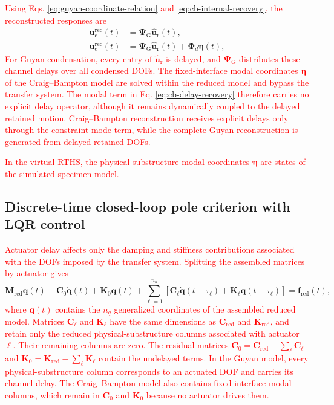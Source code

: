 \documentclass[11pt,a4paper]{article}
\numberwithin{equation}{section}
\newcommand{\rev}[1]{\textcolor{red}{#1}}
\begin{document}
\rev{Using Eqs. \eqref{eq:guyan-coordinate-relation} and \eqref{eq:cb-internal-recovery}, the reconstructed responses are}
\begin{subequations}
	\label{eq:delay-recovery}
	\begin{align}
		\bm{u}_{\mathrm{c}}^{\mathrm{rec}}(t)&=\bm{\Psi}_{\mathrm{G}}\hat{\bm{u}}_{\mathrm{r}}(t),
		\label{eq:guyan-delay-recovery}\\
		\bm{u}_{\mathrm{c}}^{\mathrm{rec}}(t)&=\bm{\Psi}_{\mathrm{G}}\hat{\bm{u}}_{\mathrm{r}}(t)
		+\bm{\Phi}_{d}\bm{\eta}(t),
		\label{eq:cb-delay-recovery}
	\end{align}
\end{subequations}
\rev{For Guyan condensation, every entry of \(\hat{\bm{u}}_{\mathrm{r}}\) is delayed, and \(\bm{\Psi}_{\mathrm{G}}\) distributes these channel delays over all condensed DOFs. The fixed-interface modal coordinates \(\bm{\eta}\) of the Craig--Bampton model are solved within the reduced model and bypass the transfer system. The modal term in Eq. \eqref{eq:cb-delay-recovery} therefore carries no explicit delay operator, although it remains dynamically coupled to the delayed retained motion. Craig--Bampton reconstruction receives explicit delays only through the constraint-mode term, while the complete Guyan reconstruction is generated from delayed retained DOFs.}

\rev{In the virtual RTHS, the physical-substructure modal coordinates \(\bm{\eta}\) are states of the simulated specimen model.}

\subsection{Discrete-time closed-loop pole criterion with LQR control}
\label{sec:pole-criterion}

\rev{Actuator delay affects only the damping and stiffness contributions associated with the DOFs imposed by the transfer system. Splitting the assembled matrices by actuator gives}
\begin{equation}
	\mathbf{M}_{\mathrm{red}}\ddot{\bm{q}}(t)+\mathbf{C}_{0}\dot{\bm{q}}(t)+\mathbf{K}_{0}\bm{q}(t)
	+\sum_{\ell=1}^{n_{\mathrm{a}}}
	\left[
	\mathbf{C}_{\ell}\dot{\bm{q}}(t-\tau_{\ell})
	+\mathbf{K}_{\ell}\bm{q}(t-\tau_{\ell})
	\right]
	=\bm{f}_{\mathrm{red}}(t),
	\label{eq:delayed-eom}
\end{equation}
\rev{where \(\bm{q}(t)\) contains the \(n_{q}\) generalized coordinates of the assembled reduced model. Matrices \(\mathbf{C}_{\ell}\) and \(\mathbf{K}_{\ell}\) have the same dimensions as \(\mathbf{C}_{\mathrm{red}}\) and \(\mathbf{K}_{\mathrm{red}}\), and retain only the reduced physical-substructure columns associated with actuator \(\ell\). Their remaining columns are zero. The residual matrices \(\mathbf{C}_{0}=\mathbf{C}_{\mathrm{red}}-\sum_{\ell}\mathbf{C}_{\ell}\) and \(\mathbf{K}_{0}=\mathbf{K}_{\mathrm{red}}-\sum_{\ell}\mathbf{K}_{\ell}\) contain the undelayed terms. In the Guyan model, every physical-substructure column corresponds to an actuated DOF and carries its channel delay. The Craig--Bampton model also contains fixed-interface modal columns, which remain in \(\mathbf{C}_{0}\) and \(\mathbf{K}_{0}\) because no actuator drives them.}
\end{document}
